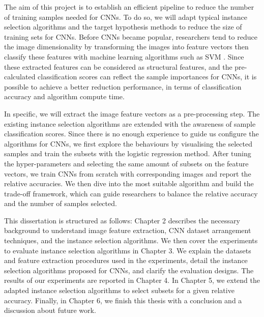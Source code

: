 The aim of this project is to establish an efficient pipeline to reduce the number of training samples needed for CNNs. To do so, we will adapt typical instance selection algorithms and the target hypothesis methods to reduce the size of training sets for CNNs. Before CNNs became popular, researchers tend to reduce the image dimensionality by transforming the images into feature vectors then classify these features with machine learning algorithms such as SVM \cite{Popovici2003, Csurka2004}. Since these extracted features can be considered as structural features, and the pre-calculated classification scores can reflect the sample importances for CNNs, it is possible to achieve a better reduction performance, in terms of classification accuracy and algorithm compute time. 

In specific, we will extract the image feature vectors as a pre-processing step. The existing instance selection algorithms are extended with the awareness of sample classification scores. Since there is no enough experience to guide us configure the algorithms for CNNs, we first explore the behaviours by visualising the selected samples and train the subsets with the logistic regression method. After tuning the hyper-parameters and selecting the same amount of subsets on the feature vectors, we train CNNs from scratch with corresponding images and report the relative accuracies. We then dive into the most suitable algorithm and build the trade-off framework, which can guide researchers to balance the relative accuracy and the number of samples selected. 

This dissertation is structured as follows: Chapter 2 describes the necessary background to understand image feature extraction, CNN dataset arrangement techniques, and the instance selection algorithms. We then cover the experiments to evaluate instance selection algorithms in Chapter 3. We explain the datasets and feature extraction procedures used in the experiments, detail the instance selection algorithms proposed for CNNs, and clarify the evaluation designs. The results of our experiments are reported in Chapter 4. In Chapter 5, we extend the adapted instance selection algorithms to select subsets for a given relative accuracy. Finally, in Chapter 6, we finish this thesis with a conclusion and a discussion about future work.



